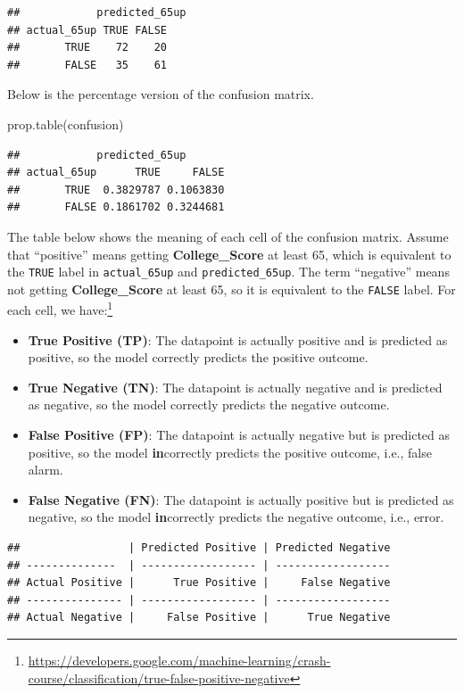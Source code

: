 \documentclass[
]{article}
\newenvironment{Shaded}{\begin{snugshade}}{\end{snugshade}}
\newcommand{\FunctionTok}[1]{\textcolor[rgb]{0.00,0.00,0.00}{#1}}
\newcommand{\NormalTok}[1]{#1}
\providecommand{\tightlist}{%
  \setlength{\itemsep}{0pt}\setlength{\parskip}{0pt}}
\begin{document}
\begin{verbatim}
##            predicted_65up
## actual_65up TRUE FALSE
##       TRUE    72    20
##       FALSE   35    61
\end{verbatim}

Below is the percentage version of the confusion matrix.

\begin{Shaded}
\begin{Highlighting}[]
\FunctionTok{prop.table}\NormalTok{(confusion)}
\end{Highlighting}
\end{Shaded}

\begin{verbatim}
##            predicted_65up
## actual_65up      TRUE     FALSE
##       TRUE  0.3829787 0.1063830
##       FALSE 0.1861702 0.3244681
\end{verbatim}

The table below shows the meaning of each cell of the confusion matrix.
Assume that ``positive'' means getting \textbf{College\_Score} at least
65, which is equivalent to the \texttt{TRUE} label in
\texttt{actual\_65up} and \texttt{predicted\_65up}. The term
``negative'' means not getting \textbf{College\_Score} at least 65, so
it is equivalent to the \texttt{FALSE} label. For each cell, we
have:\footnote{\url{https://developers.google.com/machine-learning/crash-course/classification/true-false-positive-negative}}

\begin{itemize}
\tightlist
\item
  \textbf{True Positive (TP)}: The datapoint is actually positive and is
  predicted as positive, so the model correctly predicts the positive
  outcome.
\item
  \textbf{True Negative (TN)}: The datapoint is actually negative and is
  predicted as negative, so the model correctly predicts the negative
  outcome.
\item
  \textbf{False Positive (FP)}: The datapoint is actually negative but
  is predicted as positive, so the model \textbf{in}correctly predicts
  the positive outcome, i.e., false alarm.
\item
  \textbf{False Negative (FN)}: The datapoint is actually positive but
  is predicted as negative, so the model \textbf{in}correctly predicts
  the negative outcome, i.e., error.
\end{itemize}

\begin{verbatim}
##                 | Predicted Positive | Predicted Negative
## --------------  | ------------------ | ------------------
## Actual Positive |      True Positive |     False Negative
## --------------- | ------------------ | ------------------
## Actual Negative |     False Positive |      True Negative
\end{verbatim}
\end{document}
